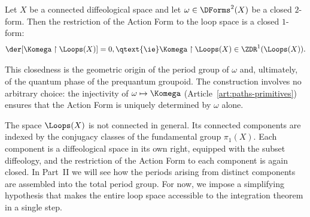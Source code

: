 \begin{article}
  \begin{proposition}
    Let $X$ be a connected diffeological space and let
    $\omega \in \DForms^2(X)$ be a closed $2$-form.
    Then the restriction of the Action Form to the loop space
    is a closed $1$-form:
    \[
      \der[\Komega \restriction \Loops(X)] = 0,
      \qtext{\ie}
      \Komega \restriction \Loops(X) \in \ZDR^1(\Loops(X)).
      \]%
  \end{proposition}
  
  This closedness is the geometric origin of the period group of $\omega$
  and, ultimately, of the quantum phase of the prequantum groupoid.
  The construction involves no arbitrary choice:
  the injectivity of $\omega \mapsto \Komega$
  (Article~\ref{art:paths-primitives})
  ensures that the Action Form is uniquely determined by $\omega$ alone.
  
  The space $\Loops(X)$ is not connected in general.
  Its connected components are indexed by the conjugacy classes
  of the fundamental group $\pi_1(X)$.
  Each component is a diffeological space in its own right,
  equipped with the subset diffeology,
  and the restriction of the Action Form to each component is again closed.
  In Part~II we will see how the periods arising from distinct components
  are assembled into the total period group.
  For now,
  we impose a simplifying hypothesis that makes the entire loop space
  accessible to the integration theorem in a single step.
\end{article}

